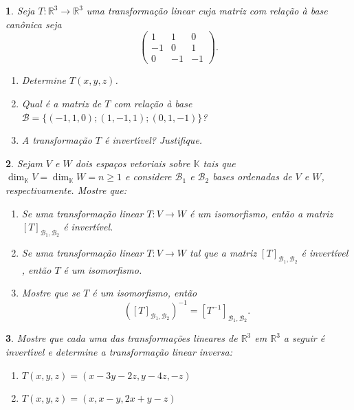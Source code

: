 \documentclass[12pt]{exam}
\newtheorem{exercicio}{}
\newcommand{\real}{\mathbb{R}}
\newcommand{\cp}[1]{\mathbb{#1}}
\begin{document}
\begin{exercicio}
  Seja $T : \real^3 \to \real^3$ uma transforma\c{c}\~ao linear cuja matriz com rela\c{c}\~ao \`a base can\^onica seja
  \[
    \begin{pmatrix}
      1 & 1 & 0\\
      -1 & 0 & 1\\
      0 & -1 & -1
    \end{pmatrix}.
  \]
    \begin{enumerate}[label=({\alph*})]
      \item Determine $T(x,y,z)$.
      \item Qual \'e a matriz de $T$ com rela\c{c}\~ao \`a base $\mathcal{B} = \{(-1,1,0);(1,-1,1);(0,1,-1)\}$?
      \item A transforma\c{c}\~ao $T$ \'e invert{\'\i}vel? Justifique.
    \end{enumerate}
\end{exercicio}

\begin{exercicio}
  Sejam $V$ e $W$ dois espaços vetoriais sobre $\cp{K}$ tais que $\dim_\cp{K}V = \dim_\cp{K}W = n \ge 1$ e considere $\mathcal{B}_1$ e $\mathcal{B}_2$ bases ordenadas de $V$ e $W$, respectivamente. Mostre que:
  \begin{enumerate}[label=({\alph*})]
    \item Se uma transformação linear $T : V \to W$ é um isomorfismo, então a matriz $[T]_{\mathcal{B}_1,\mathcal{B}_2}$ é invertível.
    \item Se uma transformação linear $T : V \to W$ tal que a matriz $[T]_{\mathcal{B}_1,\mathcal{B}_2}$ é invertível , então $T$ é um isomorfismo.
    \item Mostre que se $T$ é um isomorfismo, então
    \[
      \left([T]_{\mathcal{B}_1,\mathcal{B}_2}\right)^{-1} = [T^{-1}]_{\mathcal{B}_1,\mathcal{B}_2}.
    \]
  \end{enumerate}
\end{exercicio}

\begin{exercicio}
  Mostre que cada uma das transforma\c{c}\~oes lineares de $\real^3$ em $\real^3$ a seguir \'e invert{\'\i}vel e determine a transforma\c{c}\~ao linear inversa:
  \begin{enumerate}[label=({\alph*})]
    \item $T(x,y,z) = (x - 3y - 2z, y - 4z, -z)$
    \item $T(x,y,z) = (x, x - y, 2x + y -z)$
  \end{enumerate}

\end{exercicio}
\end{document}
